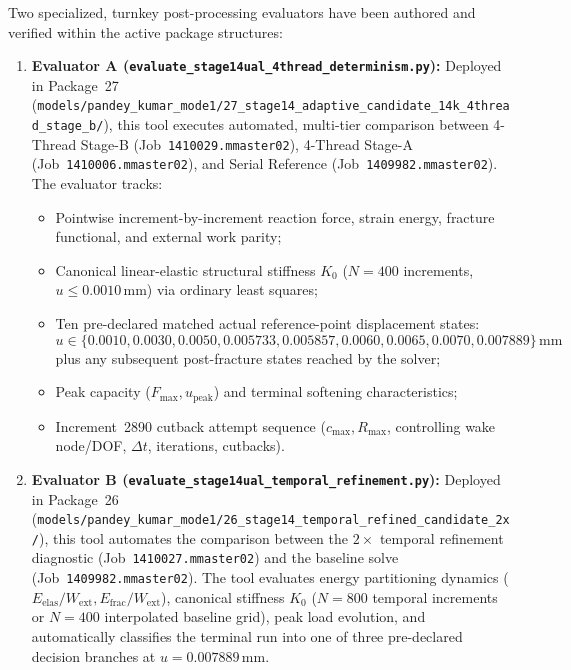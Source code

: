 Two specialized, turnkey post-processing evaluators have been authored and verified within the active package structures:
\begin{enumerate}
  \item \textbf{Evaluator A (\texttt{evaluate\_stage14ual\_4thread\_determinism.py}):} Deployed in Package~27 (\texttt{models/pandey\_kumar\_mode1/27\_stage14\_adaptive\_candidate\_14k\_4thread\_stage\_b/}), this tool executes automated, multi-tier comparison between 4-Thread Stage-B (Job~\texttt{1410029.mmaster02}), 4-Thread Stage-A (Job~\texttt{1410006.mmaster02}), and Serial Reference (Job~\texttt{1409982.mmaster02}). The evaluator tracks:
  \begin{itemize}
    \item Pointwise increment-by-increment reaction force, strain energy, fracture functional, and external work parity;
    \item Canonical linear-elastic structural stiffness $K_0$ ($N=400$ increments, $u \le 0.0010\,\mathrm{mm}$) via ordinary least squares;
    \item Ten pre-declared matched actual reference-point displacement states:
    \begin{equation}
      u \in \{0.0010, 0.0030, 0.0050, 0.005733, 0.005857, 0.0060, 0.0065, 0.0070, 0.007889\}\,\mathrm{mm}
    \end{equation}
    plus any subsequent post-fracture states reached by the solver;
    \item Peak capacity ($F_{\max}, u_{\mathrm{peak}}$) and terminal softening characteristics;
    \item Increment~2890 cutback attempt sequence ($c_{\max}, R_{\max}$, controlling wake node/DOF, $\Delta t$, iterations, cutbacks).
  \end{itemize}
  \item \textbf{Evaluator B (\texttt{evaluate\_stage14ual\_temporal\_refinement.py}):} Deployed in Package~26 (\texttt{models/pandey\_kumar\_mode1/26\_stage14\_temporal\_refined\_candidate\_2x/}), this tool automates the comparison between the $2\times$ temporal refinement diagnostic (Job~\texttt{1410027.mmaster02}) and the baseline solve (Job~\texttt{1409982.mmaster02}). The tool evaluates energy partitioning dynamics ($E_{\mathrm{elas}}/W_{\mathrm{ext}}, E_{\mathrm{frac}}/W_{\mathrm{ext}}$), canonical stiffness $K_0$ ($N=800$ temporal increments or $N=400$ interpolated baseline grid), peak load evolution, and automatically classifies the terminal run into one of three pre-declared decision branches at $u = 0.007889\,\mathrm{mm}$.
\end{enumerate}

